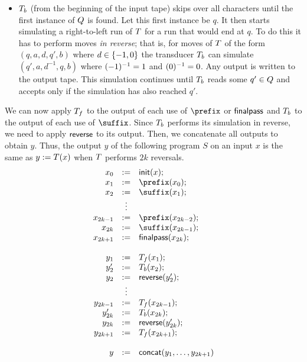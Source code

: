 {\begin{itemize}
\item
    $T_b$ (from the beginning of the input tape) skips over all
    characters until the first instance of $Q$ is found.
    Let this first instance be $q$.
    It then starts simulating a right-to-left run of $T$ for a run
    that would end at $q$.
    To do this it has to perform moves \emph{in reverse};
    that is, for moves of $T$ of the form
    $(q, a, d, q', b)$
    where
    $d \in \{-1, 0\}$
    the transducer $T_b$ can simulate
    $(q', a, d^{-1}, q, b)$
    where
        $(-1)^{-1} = 1$
        and
        $(0)^{-1} = 0$.
    Any output is written to the output tape.
    This simulation continues until $T_b$ reads some
    $q' \in Q$
    and accepts only if the simulation has also reached $q'$.
\end{itemize}

We can now apply $T_f$ to the output of each use of $\prefix$ or
$\mathsf{finalpass}$ and $T_b$ to the output of each use of $\suffix$.
%
Since $T_b$ performs its simulation in reverse, we need to apply
$\mathsf{reverse}$ to its output.
%
Then, we concatenate all outputs to obtain $y$.
%
Thus, the output $y$ of the following program $S$ on an input $x$ is the same
as
$y := T(x)$
when $T$ performs $2k$ reversals.
\[
    \begin{array}{rcl}
        x_0 &:=& \init(x); \\
        x_1 &:=& \prefix(x_0); \\
        x_2 &:=& \suffix(x_1); \\
        &\vdots& \\
        x_{2k-1} &:=& \prefix(x_{2k-2}); \\
        x_{2k} &:=& \suffix(x_{2k-1}); \\
        x_{2k+1} &:=& \finalpass(x_{2k}); \\
        \\
        y_1 &:=& \Transducer_f(x_1); \\
        y'_2 &:=& \Transducer_b(x_2); \\
        y_2 &:=& \reverse(y'_2); \\
        &\vdots& \\
        y_{2k-1} &:=& \Transducer_f(x_{2k-1}); \\
        y'_{2k} &:=& \Transducer_b(x_{2k}); \\
        y_{2k} &:=& \reverse(y'_{2k}); \\
        y_{2k+1} &:=& \Transducer_f(x_{2k+1}); \\
        \\
        y &:=& \concatpt(y_1, \ldots, y_{2k+1})
    \end{array}
\]


}
